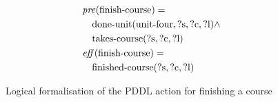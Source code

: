 \begin{figure}[t]
  \small  %
  \begin{align*}
  &\mathit{pre}(\text{finish-course}) = \\
  &\quad \text{done-unit}(\text{unit-four}, \text{?s}, \text{?c}, \text{?l}) \land \\
  &\quad \text{takes-course}(\text{?s}, \text{?c}, \text{?l}) \\
  &\mathit{eff}(\text{finish-course}) = \\
  &\quad \text{finished-course}(\text{?s}, \text{?c}, \text{?l})
  \end{align*}
  \caption{Logical formalisation of the PDDL action for finishing a course}\label{fig:finish-course}
\end{figure}